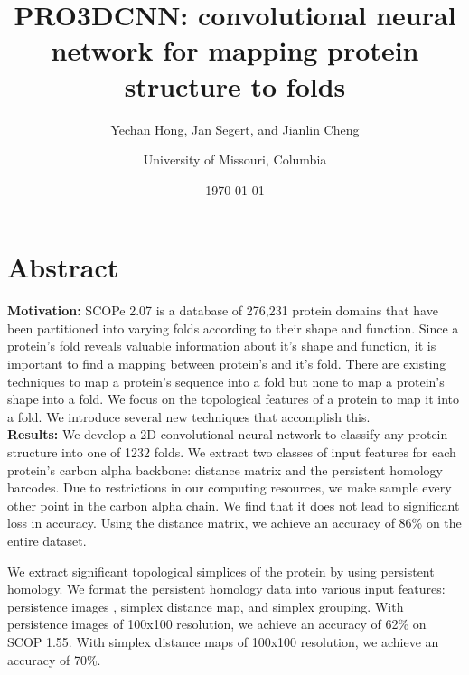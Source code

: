 \documentclass[12pt, a4paper, twocolumn, fullpage]{article}
\title{PRO3DCNN: convolutional neural network for mapping protein structure to folds}
\author{Yechan Hong, Jan Segert, and Jianlin Cheng
\and University of Missouri, Columbia}
\date{\today}
\theoremstyle{plain}
\theoremstyle{definition}
\theoremstyle{remark}
\begin{document}
\maketitle

\section*{Abstract}

\textbf{Motivation:} SCOPe 2.07 is a database of 276,231 protein domains that have been partitioned into varying folds according to their shape and function. Since a protein's fold reveals valuable information about it's shape and function, it is important to find a mapping between protein's and it's fold. There are existing techniques to map a protein's sequence into a fold \cite{deepsf} but none to map a protein's shape into a fold. We focus on the topological features of a protein to map it into a fold. We introduce several new techniques that accomplish this.
\\
\textbf{Results:} We develop a 2D-convolutional neural network to classify any protein structure into one of 1232 folds. 
We extract two classes of input features for each protein's carbon alpha backbone: distance matrix and the persistent homology barcodes. Due to restrictions in our computing resources, we make sample every other point in the carbon alpha chain. We find that it does not lead to significant loss in accuracy.
Using the distance matrix, we achieve an accuracy of 86\% on the entire dataset.

We extract significant topological simplices of the protein by using persistent homology. We format the persistent homology data into various input features: persistence images \cite{persistenceImages}, simplex distance map, and simplex grouping.  With persistence images of 100x100 resolution, we achieve an accuracy of 62\% on SCOP 1.55. With simplex distance maps of 100x100 resolution, we achieve an accuracy of 70\%.
    

\end{document}
